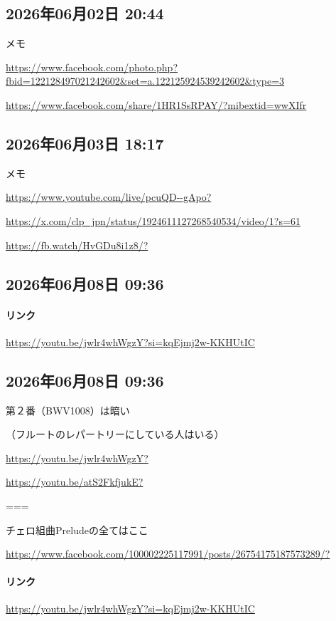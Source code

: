 \subsection*{2026年06月02日 20:44}

メモ

\url{https://www.facebook.com/photo.php?fbid=122128497021242602&set=a.122125924539242602&type=3}

\url{https://www.facebook.com/share/1HR1SsRPAY/?mibextid=wwXIfr}

\subsection*{2026年06月03日 18:17}

メモ

\url{https://www.youtube.com/live/pcuQD--gApo?}

\url{https://x.com/clp_jpn/status/1924611127268540534/video/1?s=61}

\url{https://fb.watch/HvGDu8i1z8/?}

\subsection*{2026年06月08日 09:36}

\paragraph{リンク}
\url{https://youtu.be/jwlr4whWgzY?si=kqEjmj2w-KKHUtIC}

\subsection*{2026年06月08日 09:36}

第２番（BWV1008）は暗い

（フルートのレパートリーにしている人はいる）

\url{https://youtu.be/jwlr4whWgzY?}

\url{https://youtu.be/atS2FkfjukE?}

===

チェロ組曲Preludeの全てはここ

\url{https://www.facebook.com/100002225117991/posts/26754175187573289/?}

\paragraph{リンク}
\url{https://youtu.be/jwlr4whWgzY?si=kqEjmj2w-KKHUtIC}

